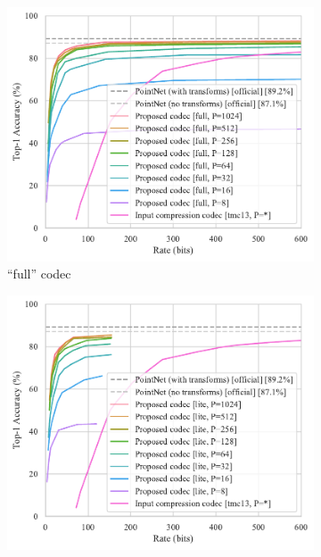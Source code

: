 \begin{figure}[htbp]
  \centering
  \newcommand{\subfigurehspace}{.25\linewidth}
  \begin{subfigure}[b]{\subfigurehspace}
    \includegraphics[width=\linewidth]{img/point_cloud_compression/rate_accuracy/modelnet40_full.pdf}
    \caption{``full'' codec}
    \label{fig:rate-accuracy/full}
  \end{subfigure}%
  \hfill%
  \begin{subfigure}[b]{\subfigurehspace}
    \centering
    \includegraphics[width=\linewidth]{img/point_cloud_compression/rate_accuracy/modelnet40_lite.pdf}

\end{subfigure}
\end{figure}
